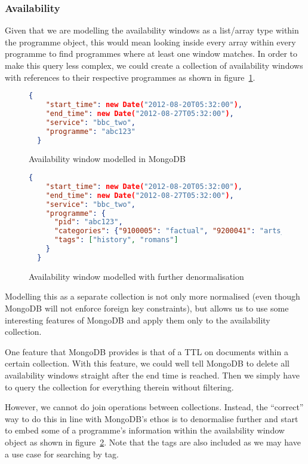 \documentclass[11pt,a4paper]{article}
\begin{document}
\subsubsection{Availability}

Given
that we are modelling the availability windows as a list/array
type within the programme object, this would mean looking inside
every array within every programme to find programmes where
at least one window matches. In order to make this query
less complex, we could create a collection of availability
windows with references to their respective programmes as shown
in figure~\ref{fig:mongo-availability-window}.

\begin{figure}[p]
\begin{lstlisting}[language=json]
  {
    "start_time": new Date("2012-08-20T05:32:00"),
    "end_time": new Date("2012-08-27T05:32:00"),
    "service": "bbc_two",
    "programme": "abc123"
  }
\end{lstlisting}
  \caption{Availability window modelled in MongoDB}
  \label{fig:mongo-availability-window}
\end{figure}

\begin{figure}[p]
\begin{lstlisting}[language=json]
  {
    "start_time": new Date("2012-08-20T05:32:00"),
    "end_time": new Date("2012-08-27T05:32:00"),
    "service": "bbc_two",
    "programme": {
      "pid": "abc123",
      "categories": {"9100005": "factual", "9200041": "arts_culture_and_the_media"},
      "tags": ["history", "romans"]
    }
  }
\end{lstlisting}
  \caption{Availability window modelled with further denormalisation}
  \label{fig:mongo-availability-denormal}
\end{figure}

Modelling this as a separate collection is not only more
normalised (even though MongoDB will not enforce foreign key
constraints), but allows us to use some interesting features
of MongoDB and apply them only to the availability collection.

One feature that MongoDB provides is that of a TTL on documents
within a certain collection. \cite{mongo-expiry} With this
feature, we could well tell MongoDB to delete all availability
windows straight after the end time is reached.
Then we simply have to query the collection
for everything therein without filtering.

However, we cannot do join operations between collections. Instead,
the ``correct'' way to do this in line with MongoDB's ethos
is to denormalise further and start to embed some of a
programme's information within the availability window
object as shown in figure~\ref{fig:mongo-availability-denormal}.
Note that the tags are also included as we may have a use
case for searching by tag.
\end{document}

